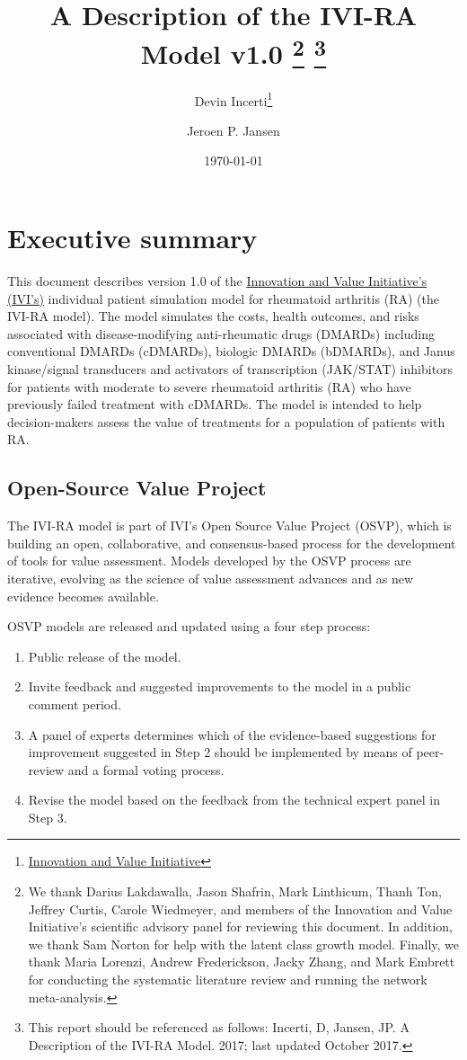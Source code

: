 \documentclass[11pt,final,fleqn]{article}\usepackage[]{graphicx}\usepackage[]{color}
\title{A Description of the IVI-RA Model v1.0 
\thanks{We thank Darius Lakdawalla, Jason Shafrin, Mark Linthicum, Thanh Ton, Jeffrey Curtis, Carole Wiedmeyer, and members of the Innovation and Value Initiative's scientific advisory panel for reviewing this document. In addition, we thank Sam Norton for help with the latent class growth model. Finally, we thank Maria Lorenzi, Andrew Frederickson, Jacky Zhang, and Mark Embrett for conducting the systematic literature review and running the network meta-analysis.} 
\footnote{This report should be referenced as follows: Incerti, D, Jansen, JP. A Description of the IVI-RA Model. 2017; last updated October 2017.}
}
\author{Devin Incerti\footnote{\href{http://www.thevalueinitiative.org/}{Innovation and Value Initiative}} \and Jeroen P. Jansen\sameaff}
\date{\today}
\theoremstyle{plain}
\begin{document}
\maketitle

\begingroup
 \hypersetup{linkcolor=black} \tableofcontents
 \listoffigures
 \listoftables
\endgroup



\clearpage
{}
\section*{Executive summary}\label{sec:executive-summary}
This document describes version 1.0 of the \href{http://www.thevalueinitiative.org/}{Innovation and Value Initiative's (IVI's)} individual patient simulation model for rheumatoid arthritis (RA) (the IVI-RA model). The model simulates the costs, health outcomes, and risks associated with disease-modifying anti-rheumatic drugs (DMARDs) including conventional DMARDs (cDMARDs), biologic DMARDs (bDMARDs), and Janus kinase/signal transducers and activators of transcription (JAK/STAT) inhibitors for patients with moderate to severe rheumatoid arthritis (RA) who have previously failed treatment with cDMARDs. The model is intended to help decision-makers assess the value of treatments for a population of patients with RA.

\subsection*{Open-Source Value Project}
The IVI-RA model is part of IVI's Open Source Value Project (OSVP), which is building an open, collaborative, and consensus-based process for the development of tools for value assessment. Models developed by the OSVP process are iterative, evolving as the science of value assessment advances and as new evidence becomes available.

OSVP models are released and updated using a four step process:

\begin{enumerate}
\item Public release of the model.
\item Invite feedback and suggested improvements to the model in a public comment period.
\item A panel of experts determines which of the evidence-based suggestions for improvement suggested in Step 2 should be implemented by means of peer-review and a formal voting process. 
\item Revise the model based on the feedback from the technical expert panel in Step 3. 
\end{enumerate}
\end{document}
